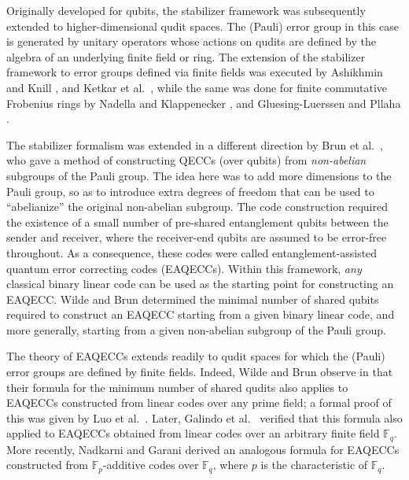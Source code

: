 \documentclass{article}
\def\F{\mathbb{F}}
\theoremstyle{remark}
\theoremstyle{definition}
\numberwithin{equation}{section}
\begin{document}
Originally developed for qubits, the stabilizer framework was subsequently extended to higher-dimensional qudit spaces. The (Pauli) error group in this case is generated by unitary operators whose actions on qudits are defined by the algebra of an underlying finite field or ring. The extension of the stabilizer framework to error groups defined via finite fields was executed by Ashikhmin and Knill \cite{ashikhmin}, and Ketkar et al.\ \cite{ketkar}, while the same was done for finite commutative Frobenius rings by Nadella and Klappenecker \cite{nadella}, and Gluesing-Luerssen and Pllaha \cite{luerssen}.

The stabilizer formalism was extended in a different direction by Brun et al.\ \cite{brun}, who gave a method of constructing QECCs (over qubits) from \emph{non-abelian} subgroups of the Pauli group. The idea here was to add more dimensions to the Pauli group, so as to introduce extra degrees of freedom that can be used to ``abelianize'' the original non-abelian subgroup. The code construction required the existence of a small number of pre-shared entanglement qubits between the sender and receiver, where the receiver-end qubits are assumed to be error-free throughout. As a consequence, these codes were called entanglement-assisted quantum error correcting codes (EAQECCs). Within this framework, \emph{any} classical binary linear code can be used as the starting point for constructing an EAQECC. Wilde and Brun \cite{wilde} determined the minimal number of shared qubits required to construct an EAQECC starting from a given binary linear code, and more generally, starting from a given non-abelian subgroup of the Pauli group. 

The theory of EAQECCs extends readily to qudit spaces for which the (Pauli) error groups are defined by finite fields. Indeed, Wilde and Brun observe in \cite[Remark~1]{wilde} that their formula for the minimum number of shared qudits also applies to EAQECCs constructed from linear codes over any prime field; a formal proof of this was given by Luo et al.\ \cite{luo}. Later, Galindo et al.\ \cite{galindo} verified that this formula also applied to EAQECCs obtained from linear codes over an arbitrary finite field $\F_q$. More recently, Nadkarni and Garani \cite{nadkarni} derived an analogous formula for EAQECCs constructed from $\F_p$-additive codes over $\F_q$, where $p$ is the characteristic of $\F_q$.
\end{document}

